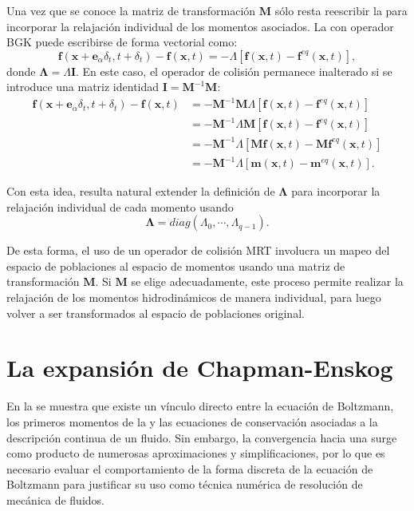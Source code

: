 Una vez que se conoce la matriz de transformaci\'on $\bm{M}$ s\'olo resta reescribir la \lbe{} para incorporar la relajaci\'on individual de los momentos asociados. La \lbe{} con operador BGK puede escribirse de forma vectorial como:
\begin{equation}
	\bm{f}(\bm{x}+\bm{e}_{\alpha}\delta_t, t+\delta_t) - \bm{f}(\bm{x},t) = -\Lambda \left[ \bm{f}(\bm{x},t) - \bm{f}^{eq}(\bm{x},t) \right],
\end{equation}
donde $\bm{\Lambda} = \Lambda \bm{I}$. En este caso, el operador de colisi\'on permanece inalterado si se introduce una matriz identidad $\bm{I}=\bm{M}^{-1}\bm{M}$:
\begin{equation}
	\begin{aligned}
		\bm{f}(\bm{x}+\bm{e}_{\alpha}\delta_t, t+\delta_t) - \bm{f}(\bm{x},t) &= -\bm{M}^{-1}\bm{M} \Lambda \left[ \bm{f}(\bm{x},t) - \bm{f}^{eq}(\bm{x},t) \right] \\
		&= -\bm{M}^{-1} \Lambda \bm{M} \left[ \bm{f}(\bm{x},t) - \bm{f}^{eq}(\bm{x},t) \right] \\
		&= -\bm{M}^{-1} \Lambda \left[ \bm{M}\bm{f}(\bm{x},t) - \bm{M}\bm{f}^{eq}(\bm{x},t) \right] \\
		&= -\bm{M}^{-1} \Lambda \left[ \bm{m}(\bm{x},t) - \bm{m}^{eq}(\bm{x},t) \right] .	
	\end{aligned}
\end{equation}

Con esta idea, resulta natural extender la definici\'on de $\bm{\Lambda}$ para incorporar la relajaci\'on individual de cada momento usando
\begin{equation}
	\bm{\Lambda}=diag(\Lambda_0, \cdots, \Lambda_{q-1}).
\end{equation}

De esta forma, el uso de un operador de colisi\'on MRT involucra un mapeo del espacio de poblaciones al espacio de momentos usando una matriz de transformaci\'on $\bm{M}$. Si $\bm{M}$ se elige adecuadamente, este proceso permite realizar la relajaci\'on de los momentos hidrodin\'amicos de manera individual, para luego volver a ser transformados al espacio de poblaciones original.




\section{La expansi\'on de Chapman-Enskog}
\label{sec:chapman}

En la  se muestra que existe un v\'inculo directo entre la ecuaci\'on de Boltzmann, los primeros momentos de la \fdp{} y las ecuaciones de conservaci\'on asociadas a la descripci\'on continua de un fluido. Sin embargo, la convergencia hacia una \lbe{} surge como producto de numerosas aproximaciones y simplificaciones, por lo que es necesario evaluar el comportamiento de la forma discreta de la ecuaci\'on de Boltzmann para justificar su uso como t\'ecnica num\'erica de resoluci\'on de mec\'anica de fluidos.

